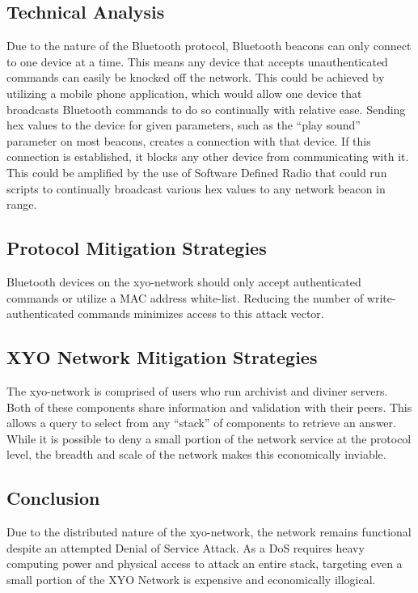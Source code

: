 \documentclass{article}
\begin{document}
\subsection{Technical Analysis}

Due to the nature of the Bluetooth protocol, Bluetooth beacons can only connect to one device at a time. This means any device that accepts unauthenticated commands can easily be knocked off the network. This could be achieved by utilizing a mobile phone application, which would allow one device that broadcasts Bluetooth commands to do so continually with relative ease. Sending hex values to the device for given parameters, such as the ``play sound'' parameter on most beacons, creates a connection with that device. If this connection is established, it blocks any other device from communicating with it. This could be amplified by the use of Software Defined Radio that could run scripts to continually broadcast various hex values to any network beacon in range. 

\subsection{Protocol Mitigation Strategies}
Bluetooth devices on the \Gls{xyo-network} should only accept authenticated commands or utilize a MAC address white-list. Reducing the number of write-authenticated commands minimizes access to this attack vector. 

\subsection{XYO Network Mitigation Strategies}
The \Gls{xyo-network} is comprised of users who run \Gls{archivist} and \Gls{diviner} servers. Both of these components share information and validation with their peers. This allows a query to select from any ``stack'' of components to retrieve an answer. While it is possible to deny a small portion of the network service at the protocol level, the breadth and scale of the network makes this economically inviable. 

\subsection{Conclusion}
Due to the distributed nature of the \Gls{xyo-network}, the network remains functional despite an attempted Denial of Service Attack. As a DoS requires heavy computing power and physical access to attack an entire stack, targeting even a small portion of the XYO Network is expensive and economically illogical.
\end{document}
